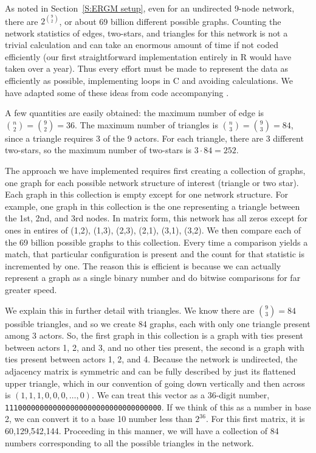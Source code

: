 \label{A:Triangle count}
As noted in Section~\ref{S:ERGM setup}, even for an undirected 9-node network, 
there are $2^{{9\choose 2}}$, or about 69 billion different possible graphs.
Counting the network statistics of edges, two-stars, and triangles for this
network is not a trivial calculation and can take an enormous amount of time 
if not coded efficiently (our first straightforward implementation 
entirely in R would have taken over a year).  Thus every effort must 
be made to represent the data as efficiently as possible, 
implementing loops in C and avoiding calculations.  We have adapted some of
these ideas from code accompanying \citet{Rinaldo:2009}.

A few quantities are easily obtained: the maximum number of edge is 
${n \choose 2} = {9 \choose 2} = 36$.  The maximum number of triangles is 
${n \choose 3} = {9 \choose 3} = 84$, since a triangle requires 3 of the 9 actors.  
For each triangle, there are 3  different two-stars, so the maximum number 
of two-stars is $3 \cdot 84 = 252$.


The approach we have implemented requires first creating a collection of graphs,
one graph for each possible network structure of interest (triangle or two star).
Each graph in this collection is empty except for one network structure.  For example,
one graph in this collection is the one representing a triangle between the 1st, 2nd, and 3rd nodes.  In matrix
form, this network has all zeros except for ones in entires of (1,2), (1,3), (2,3), 
(2,1), (3,1), (3,2).
We then compare each of the 69 billion possible graphs to this collection.
Every time a comparison yields a match, that particular configuration is present
and the count for that statistic is incremented by one.  
The reason this is efficient is because we can actually represent  
a graph as a single binary number and do bitwise comparisons for far greater speed.

We explain this in further detail with triangles.
We know there are ${9 \choose 3} = 84$ possible triangles, and so we create
84 graphs, each with only one triangle present among 3 actors.  
So, the first graph in this collection is a graph with ties present between 
actors 1, 2, and 3, and no other ties present, the second is 
a graph with ties present between actors 1, 2, and 4.  
Because the network is undirected, the adjacency matrix is symmetric and 
can be fully described by just its flattened upper triangle, which in our convention 
of going down vertically and then across is $(1,1,1,0,0,0, \ldots,0)$.  
We can treat this vector as a 36-digit number, 
\texttt{111000000000000000000000000000000000}.  If we think of this as a number 
in base 2, we can convert it to a base 10 number less than $2^{36}$.  
For this first matrix, it is 60,129,542,144.  Proceeding in this manner, 
we will have a collection of 84 numbers corresponding to all the possible 
triangles in the network.  

